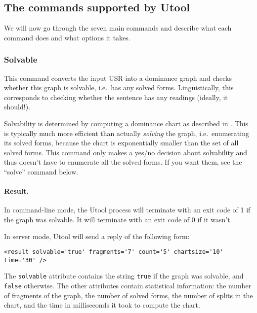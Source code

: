 \subsection{The commands supported by Utool}

We will now go through the seven main commands and describe what each
command does and what options it takes.


\subsubsection{Solvable}

This command converts the input USR into a dominance graph and checks
whether this graph is solvable, i.e.\ has any solved
forms. Linguistically, this corresponds to checking whether the
sentence has any readings (ideally, it should!).

Solvability is determined by computing a dominance chart as described
in \cite{KolTha05b}. This is typically much more efficient than
actually \emph{solving} the graph, i.e.\ enumerating its solved forms,
because the chart is exponentially smaller than the set of all solved
forms. This command only makes a yes/no decision about solvability and
thus doesn't have to enumerate all the solved forms. If you want them,
see the ``solve'' command below.


\paragraph{Result.}
In command-line mode, the Utool process will terminate with an exit
code of 1 if the graph was solvable. It will terminate with an exit
code of 0 if it wasn't. 

In server mode, Utool will send a reply of the following form:
\begin{verbatim}
<result solvable='true' fragments='7' count='5' chartsize='10' time='30' />
\end{verbatim}

The \verb?solvable? attribute contains the string \verb?true? if the
graph was solvable, and \verb?false? otherwise. The other attributes
contain statistical information: the number of fragments of the graph,
the number of solved forms, the number of splits in the chart, and the
time in milliseconds it took to compute the chart.


